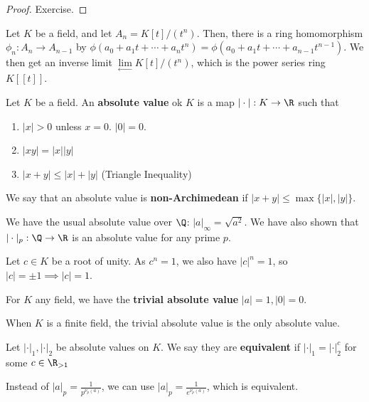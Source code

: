 \begin{proof}
    Exercise.
\end{proof}

Let $K$ be a field, and let $A_n=K[t]/(t^n)$. Then, there is a ring homomorphism $\phi_n:A_n \to A_{n-1}$ by $\phi(a_0+a_1t+\cdots+a_nt^n)=\phi(a_0+a_1t+\cdots+a_{n-1}t^{n-1})$. We then get an inverse limit $\underset{\leftarrow}{\lim}K[t]/(t^n)$, which is the power series ring $K[[t]]$.

\begin{defn}
    Let $K$ be a field. An \textbf{absolute value} ok $K$ is a map $|\cdot|:K \to \R$ such that
    \begin{enumerate}
        \item $|x|>0$ unless $x=0$. $|0|=0$.
        \item $|xy|=|x||y|$
        \item $|x+y| \leq |x| + |y|$ (Triangle Inequality)
    \end{enumerate}
    We say that an absolute value is \textbf{non-Archimedean} if $|x+y| \leq \max\{|x|,|y|\}$.
\end{defn}

\begin{ex}
    We have the usual absolute value over $\Q$: $|a|_\infty =\sqrt{a^2}$. We have also shown that $|\cdot |_p:\Q \to \R$ is an absolute value for any prime $p$.
\end{ex}

\begin{ex}
    Let $c \in K$ be a root of unity. As $c^n=1$, we also have $|c|^n=1$, so $|c|=\pm1 \implies |c|=1$.
\end{ex}

\begin{defn}
    For $K$ any field, we have the \textbf{trivial absolute value} $|a|=1,|0|=0$.
\end{defn}

\begin{prop}
    When $K$ is a finite field, the trivial absolute value is the only absolute value.
\end{prop}

\begin{defn}
    Let $|\cdot|_1,|\cdot|_2$ be absolute values on $K$. We say they are \textbf{equivalent} if $|\cdot |_1=|\cdot |_2^c$ for some $c \in \R_{>1}$
\end{defn}

\begin{ex}
    Instead of $|a|_p=\frac{1}{p^{\nu_p(a)}}$, we can use $|a|_p=\frac{1}{e^{\nu_p(a)}}$, which is equivalent.
\end{ex}

